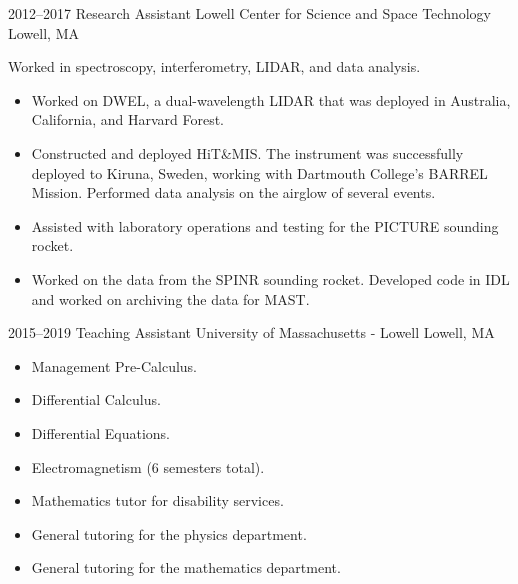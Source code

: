 \documentclass[a4paper,sans]{moderncv}
\begin{document}
        \cventry%
            {2012--2017}
            {Research Assistant}
            {Lowell Center for Science and Space Technology}
            {Lowell, MA}
            {}
            {%
                Worked in spectroscopy, interferometry,
                LIDAR, and data analysis.
                \begin{itemize}
                    \item
                        Worked on DWEL, a dual-wavelength LIDAR that was
                        deployed in Australia, California, and Harvard Forest.
                    \item
                        Constructed and deployed HiT\&MIS. The
                        instrument was successfully deployed to Kiruna,
                        Sweden, working with Dartmouth College's BARREL
                        Mission. Performed data analysis on the airglow of
                        several events.
                    \item
                        Assisted with laboratory operations and testing for the
                        PICTURE sounding rocket.
                    \item
                        Worked on the data from the SPINR sounding rocket.
                        Developed code in IDL and worked on archiving the
                        data for MAST.
                \end{itemize}%
             }
        \cventry%
            {2015--2019}
            {Teaching Assistant}
            {University of Massachusetts - Lowell}
            {Lowell, MA}
            {}
            {%
                \begin{itemize}
                    \item
                        Management Pre-Calculus.
                    \item
                        Differential Calculus.
                    \item
                        Differential Equations.
                    \item
                        Electromagnetism (6 semesters total).
                    \item
                        Mathematics tutor for disability services.
                    \item
                        General tutoring for the physics department.
                    \item
                        General tutoring for the mathematics department.
                \end{itemize}%
            }
\end{document}
